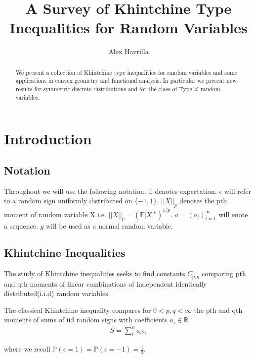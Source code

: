 \documentclass[10pt]{article}
\title{\vspace{-3em}A Survey of Khintchine Type Inequalities for Random Variables}
\author{Alex Havrilla}
\newcommand{\Pp}{\mathbb{P}}
\newcommand{\E}{\mathbb{E}}
\newcommand{\1}{\textbf{1}}
\newcommand{\R}{\mathbb{R}}
\theoremstyle{remark}
\theoremstyle{definition}
\begin{document}
\maketitle

\begin{abstract}
	We present a collection of Khintchine type inequalities for random variables and some applications in convex geometry and functional analysis. In particular we present new results for symmetric discrete distributions and for the class of Type $\mathcal{L}$ random variables.
\end{abstract}

\newpage

\tableofcontents

\newpage

\section{Introduction}

\subsection{Notation}

Throughout we will use the following notation. $\E$ denotes expectation. $\epsilon$ will refer to a random sign uniformly distributed on $\{-1,1\}$. $||X||_p$ denotes the pth moment of random variable X i.e. $||X||_p = (\E|X|^p)^{1/p}$. $a = (a_i)_{i=1}^{\infty}$ will enote a sequence. $g$ will be used as a normal random variable. 

\subsection{Khintchine Inequalities}


The study of Khintchine inequalities seeks to find constants $C_{p,q}$ comparing pth and qth moments of linear combinations of independent identically distributed(i.i.d) random variables. 

The classical Khintchine inequality compares for $0 < p,q < \infty$ the pth and qth moments of sums of iid random signs with coefficients $a_i \in \R$
\begin{align*}
	S = \sum_i^n a_i \epsilon_i
\end{align*}

where we recall $\Pp(\epsilon = 1) = \Pp(\epsilon = -1) = \frac{1}{2}$. 
\end{document}

